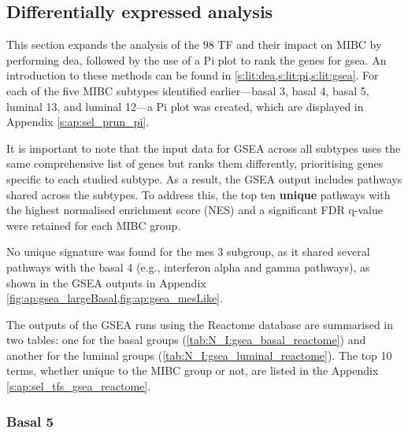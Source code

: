 \subsection{Differentially expressed analysis} \label{s:N_I:sel_tfs_subtypes}

This section expands the analysis of the 98 TF and their impact on MIBC by performing \acrfull{dea}, followed by the use of a Pi plot to rank the genes for \acrfull{gsea}. An introduction to these methods can be found in \cref{s:lit:dea,s:lit:pi,s:lit:gsea}. For each of the five MIBC subtypes identified earlier—basal 3, basal 4, basal 5, luminal 13, and luminal 12—a Pi plot was created, which are displayed in Appendix \cref{s:ap:sel_prun_pi}. 

It is important to note that the input data for GSEA across all subtypes uses the same comprehensive list of genes but ranks them differently, prioritising genes specific to each studied subtype. As a result, the GSEA output includes pathways shared across the subtypes. To address this, the top ten \textbf{unique} pathways with the highest normalised enrichment score (NES) and a significant FDR q-value were retained for each MIBC group.

No unique signature was found for the mes 3 subgroup, as it shared several pathways with the basal 4 (e.g., interferon alpha and gamma pathways), as shown in the GSEA outputs in Appendix \cref{fig:ap:gsea_largeBasal,fig:ap:gsea_mesLike}.

The outputs of the GSEA runs using the Reactome database are summarised in two tables: one for the basal groups (\cref{tab:N_I:gsea_basal_reactome}) and another for the luminal groups (\cref{tab:N_I:gsea_luminal_reactome}). The top 10 terms, whether unique to the MIBC group or not, are listed in the Appendix \cref{s:ap:sel_tfs_gsea_reactome}.


\subsubsection*{Basal 5}


